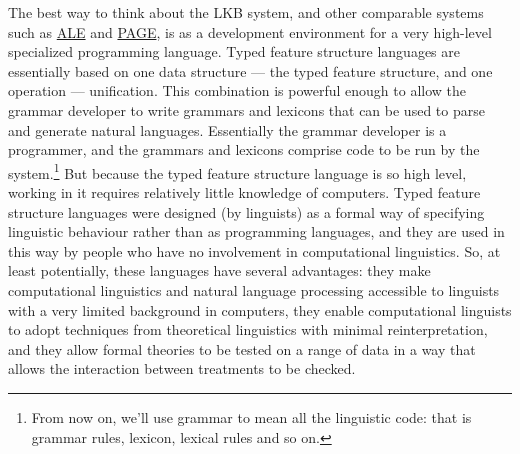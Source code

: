 \documentclass[12pt]{report}
\begin{document}
The best way to think about the LKB system, and other comparable systems such
as \href{http://www.sfs.nphil.uni-tuebingen.de/~gpenn/ale.html}{ALE} 
and \href{http://www.dfki.de/lt/systems/page/page.html}{PAGE}, 
is as a development environment for a very high-level
specialized programming language.  Typed feature structure
languages are essentially based on one data structure --- the typed feature
structure, and one operation --- unification.  This combination is powerful
enough to allow the grammar developer to write grammars and lexicons that can
be used to parse and generate natural languages.  Essentially the grammar
developer is a programmer, and the grammars and lexicons 
comprise code to be run by
the system.\footnote{From now on, we'll use grammar to mean
all the linguistic code: that is grammar rules, lexicon, lexical rules 
and so on.}  
But because the typed feature structure language 
is so high level, working in it requires relatively little knowledge
of computers.  Typed feature structure languages were designed
(by linguists) as a formal way of specifying linguistic
behaviour rather than as programming languages, and they are used
in this way by people who have no involvement in computational 
linguistics.  So, at least potentially, these languages have several
advantages: they make computational
linguistics and natural language processing accessible to linguists
with a very limited background in computers, they enable computational 
linguists to adopt techniques from theoretical linguistics with minimal 
reinterpretation, and they allow formal theories to be tested on
a range of data in a way that allows the interaction between
treatments to be checked.
\end{document}
